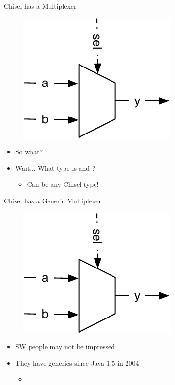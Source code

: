 \begin{frame}[fragile]{Chisel has a Multiplexer}
\begin{figure}
  \includegraphics[scale=\scale]{../figures/mux}
\end{figure}
\begin{itemize}
\item So what?
\item Wait... What type is  and ?
\begin{itemize}
\item Can be any Chisel type!
\end{itemize}
\end{itemize}
\end{frame}

\begin{frame}[fragile]{Chisel has a Generic Multiplexer}
\begin{figure}
  \includegraphics[scale=\scale]{../figures/mux}
\end{figure}
\begin{itemize}
\item SW people may not be impressed
\item They have generics since Java 1.5 in 2004
\begin{itemize}
\item {}
\end{itemize}
\end{itemize}
\end{frame}


